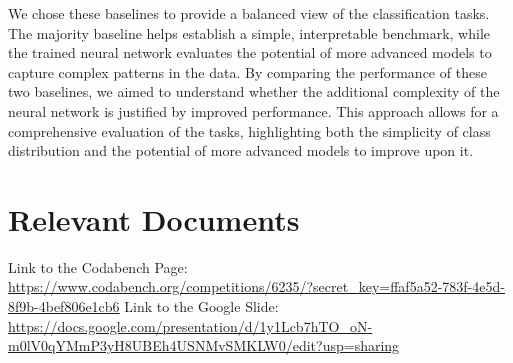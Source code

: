 \documentclass[titlepage]{article}
\begin{document}
We chose these baselines to provide a balanced view of the
classification tasks. The majority baseline helps establish a simple,
interpretable benchmark, while the trained neural network evaluates
the potential of more advanced models to capture complex patterns in
the data. By comparing the performance of these two baselines, we
aimed to understand whether the additional complexity of the neural
network is justified by improved performance. This approach allows
for a comprehensive evaluation of the tasks, highlighting both the
simplicity of class distribution and the potential of more advanced
models to improve upon it.
\section{Relevant Documents}
Link to the Codabench Page:\\
\url{https://www.codabench.org/competitions/6235/?secret_key=ffaf5a52-783f-4e5d-8f9b-4bef806e1cb6}
Link to the Google Slide:\\
\url{https://docs.google.com/presentation/d/1y1Lcb7hTO_oN-m0lV0qYMmP3yH8UBEh4USNMvSMKLW0/edit?usp=sharing}
\end{document}

